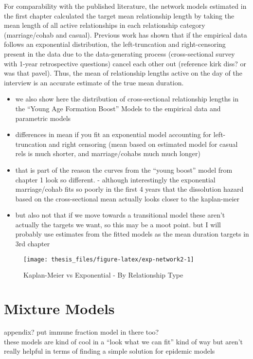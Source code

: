 \documentclass [11pt, proquest] {uwthesis}[2015/03/03]
\begin{document}
For comparability with the published literature, the network models
estimated in the first chapter calculated the target mean relationship
length by taking the mean length of all active relationships in each
relationship category (marriage/cohab and casual). Previous work has
shown that if the empirical data follows an exponential distribution,
the left-truncation and right-censoring present in the data due to the
data-generating process (cross-sectional survey with 1-year
retrospective questions) cancel each other out (reference kirk diss? or
was that pavel). Thus, the mean of relationship lengths active on the
day of the interview is an accurate estimate of the true mean duration.
\begin{itemize}
\item
  we also show here the distribution of cross-sectional relationship
  lengths in the ``Young Age Formation Boost'' Models to the empirical
  data and parametric models
\item
  differences in mean if you fit an exponential model accounting for
  left-truncation and right censoring (mean based on estimated model for
  casual rels is much shorter, and marriage/cohabs much much longer)
\item
  that is part of the reason the curves from the ``young boost'' model
  from chapter 1 look so different. - although interestingly the
  exponential marriage/cohab fits so poorly in the first 4 years that
  the dissolution hazard based on the cross-sectional mean actually
  looks closer to the kaplan-meier
\item
  but also not that if we move towards a transitional model these aren't
  actually the targets we want, so this may be a moot point. but I will
  probably use estimates from the fitted models as the mean duration
  targets in 3rd chapter
\end{itemize}
\begin{figure}
\texttt{[image: thesis\_files/figure-latex/exp-network2-1]} \caption{Kaplan-Meier vs Exponential - By Relationship Type}\label{fig:exp-network2}
\end{figure}
\section{Mixture Models}\label{mixture-models}

appendix? put immune fraction model in there too?\\
these models are kind of cool in a ``look what we can fit'' kind of way
but aren't really helpful in terms of finding a simple solution for
epidemic models
\end{document}

